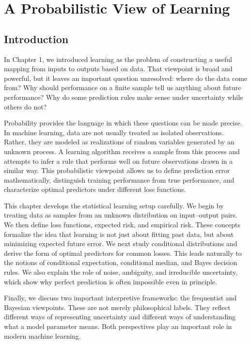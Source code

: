\chapter{A Probabilistic View of Learning}

\section{Introduction}

In Chapter 1, we introduced learning as the problem of constructing a useful mapping from inputs to outputs based on data. That viewpoint is broad and powerful, but it leaves an important question unresolved: where do the data come from? Why should performance on a finite sample tell us anything about future performance? Why do some prediction rules make sense under uncertainty while others do not?

Probability provides the language in which these questions can be made precise. In machine learning, data are not usually treated as isolated observations. Rather, they are modeled as realizations of random variables generated by an unknown process. A learning algorithm receives a sample from this process and attempts to infer a rule that performs well on future observations drawn in a similar way. This probabilistic viewpoint allows us to define prediction error mathematically, distinguish training performance from true performance, and characterize optimal predictors under different loss functions.

This chapter develops the statistical learning setup carefully. We begin by treating data as samples from an unknown distribution on input--output pairs. We then define loss functions, expected risk, and empirical risk. These concepts formalize the idea that learning is not just about fitting past data, but about minimizing expected future error. We next study conditional distributions and derive the form of optimal predictors for common losses. This leads naturally to the notions of conditional expectation, conditional median, and Bayes decision rules. We also explain the role of noise, ambiguity, and irreducible uncertainty, which show why perfect prediction is often impossible even in principle.

Finally, we discuss two important interpretive frameworks: the frequentist and Bayesian viewpoints. These are not merely philosophical labels. They reflect different ways of representing uncertainty and different ways of understanding what a model parameter means. Both perspectives play an important role in modern machine learning.

